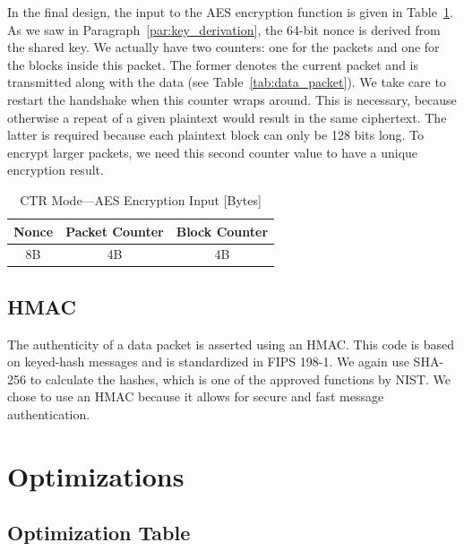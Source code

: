 \documentclass[a4paper]{article}
\begin{document}
In the final design, the input to the AES encryption function is given in Table~\ref{tab:ctr_mode_aes_encryption_input}. As we saw in Paragraph~\ref{par:key_derivation}, the 64-bit nonce is derived from the shared key. We actually have two counters: one for the packets and one for the blocks inside this packet. The former denotes the current packet and is transmitted along with the data (see Table~\ref{tab:data_packet}). We take care to restart the handshake when this counter wraps around. This is necessary, because otherwise a repeat of a given plaintext would result in the same ciphertext. The latter is required because each plaintext block can only be 128 bits long. To encrypt larger packets, we need this second counter value to have a unique encryption result.

\begin{table}[h]
    \begin{center}
        \begin{tabular}{| c | c | c |}
            \hline
            Nonce & Packet Counter & Block Counter \\ \hline
            8B & 4B & 4B \\
            \hline
        \end{tabular}
    \end{center}

    \caption{CTR Mode---AES Encryption Input [Bytes]}
    \label{tab:ctr_mode_aes_encryption_input}
\end{table}

\subsection{HMAC}

The authenticity of a data packet is asserted using an HMAC. This code is based on keyed-hash messages and is standardized in FIPS 198-1. We again use SHA-256 to calculate the hashes, which is one of the approved functions by NIST. We chose to use an HMAC because it allows for secure and fast message authentication.

\section{Optimizations}

\subsection{Optimization Table}
\end{document}
